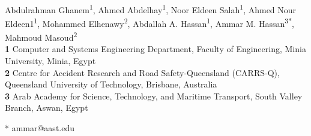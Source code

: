 \documentclass[10pt,letterpaper]{article}
\begin{document}
\vspace*{0.2in}

\begin{flushleft}
{\Large
\textbf{} %
}
\newline
\\
Abdulrahman Ghanem\textsuperscript{1},
Ahmed Abdelhay\textsuperscript{1},
Noor Eldeen Salah\textsuperscript{1},
Ahmed Nour Eldeen1\textsuperscript{1},
Mohammed Elhenawy\textsuperscript{2},
Abdallah A. Hassan\textsuperscript{1},
Ammar M. Hassan\textsuperscript{3*},
Mahmoud Masoud\textsuperscript{2}
\\
\bigskip
\textbf{1} Computer and Systems Engineering Department, Faculty of Engineering, Minia University, Minia, Egypt
\\
\textbf{2}  Centre for Accident Research and Road Safety-Queensland (CARRS-Q), Queensland University of Technology, Brisbane, Australia
\\
\textbf{3} Arab Academy for Science, Technology, and Maritime Transport, South Valley Branch, Aswan, Egypt
\\
\bigskip

% 
%





* ammar@aast.edu

\end{flushleft}
\end{document}
